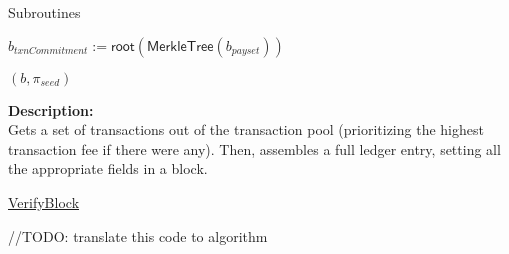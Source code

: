 \documentclass[10pt,a4paper]{article}
\begin{document}
\begin{section}{Subroutines}
\begin{algorithm}[H]
\begin{algorithmic}[1]



    \State $b_{txnCommitment} := \mathsf{root}(\mathsf{MerkleTree}(b_{payset}))$

    \State \Return $(b, \pi_{seed})$

    \EndFunction
    \end{algorithmic}
\end{algorithm}

\noindent \textbf{Description:}\\
Gets a set of transactions out of the transaction pool (prioritizing the highest transaction fee if there were any).
Then, assembles a full ledger entry, setting all the appropriate fields in a block.


\begin{algorithm}[H]
    \caption{\underline{VerifyBlock}}    
    \label{algo:verify-block}
    \begin{algorithmic}[1]


    


    //TODO: translate this code to algorithm
    \EndIf





\end{algorithmic}
\end{algorithm}
\end{section}
\end{document}
